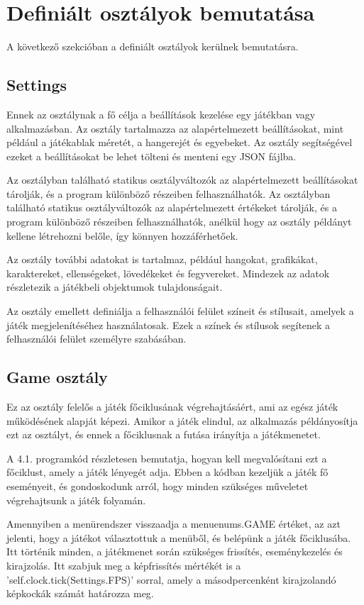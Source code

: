 \section{Definiált osztályok bemutatása}
A következő szekcióban a definiált osztályok kerülnek bemutatásra.


\subsection{Settings}
Ennek az osztálynak a fő célja a beállítások kezelése egy játékban vagy alkalmazásban. Az osztály tartalmazza az alapértelmezett beállításokat, mint például a játékablak méretét, a hangerejét és egyebeket. Az osztály segítségével ezeket a beállításokat be lehet tölteni és menteni egy JSON fájlba.

Az osztályban található statikus osztályváltozók az alapértelmezett beállításokat tárolják, és a program különböző részeiben felhasználhatók. Az osztályban található statikus osztályváltozók az alapértelmezett értékeket tárolják, és a program különböző részeiben felhasználhatók, anélkül hogy az osztály példányt kellene létrehozni belőle, így könnyen hozzáférhetőek.

Az osztály további adatokat is tartalmaz, például hangokat, grafikákat, karaktereket, ellenségeket, lövedékeket és fegyvereket. Mindezek az adatok részletezik a játékbeli objektumok tulajdonságait.

Az osztály emellett definiálja a felhasználói felület színeit és stílusait, amelyek a játék megjelenítéséhez használatosak. Ezek a színek és stílusok segítenek a felhasználói felület személyre szabásában.


\subsection{Game osztály}
Ez az osztály felelős a játék főciklusának végrehajtásáért, ami az egész játék működésének alapját képezi. Amikor a játék elindul, az alkalmazás példányosítja ezt az osztályt, és ennek a főciklusnak a futása irányítja a játékmenetet.

A 4.1. programkód részletesen bemutatja, hogyan kell megvalósítani ezt a főciklust, amely a játék lényegét adja. Ebben a kódban kezeljük a játék fő eseményeit, és gondoskodunk arról, hogy minden szükséges műveletet végrehajtsunk a játék folyamán.

Amennyiben a menürendszer visszaadja a menuenums.GAME értéket, az azt jelenti, hogy a játékot választottuk a menüből, és belépünk a játék főciklusába. Itt történik minden, a játékmenet során szükséges frissítés, eseménykezelés és kirajzolás. Itt szabjuk meg a képfrissítés mértékét is a 'self.clock.tick(Settings.FPS)' sorral, amely a másodpercenként kirajzolandó képkockák számát határozza meg.

